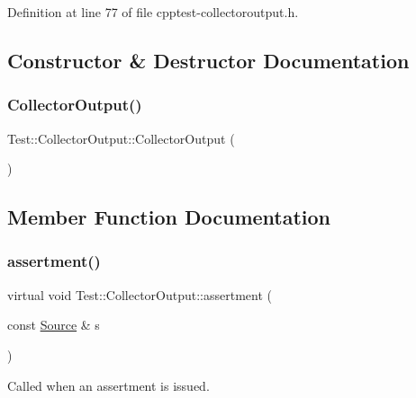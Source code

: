 Definition at line 77 of file cpptest-\/collectoroutput.\+h.



\subsection{Constructor \& Destructor Documentation}
\mbox{\label{class_test_1_1_collector_output_a852bde8f194b4f81ca36f222257adc53}} 
\subsubsection{\texorpdfstring{Collector\+Output()}{CollectorOutput()}}
{\footnotesize\ttfamily Test\+::\+Collector\+Output\+::\+Collector\+Output (\begin{DoxyParamCaption}{ }\end{DoxyParamCaption})\hspace{0.3cm}{\ttfamily [protected]}}



\subsection{Member Function Documentation}
\mbox{\label{class_test_1_1_collector_output_a96b61d5e53c3dfa1b98747bb582aa4f3}} 
\subsubsection{\texorpdfstring{assertment()}{assertment()}}
{\footnotesize\ttfamily virtual void Test\+::\+Collector\+Output\+::assertment (\begin{DoxyParamCaption}\item[{const \mbox{\hyperlink{class_test_1_1_source}{Source}} \&}]{s }\end{DoxyParamCaption})\hspace{0.3cm}{\ttfamily [virtual]}}

Called when an assertment is issued.


